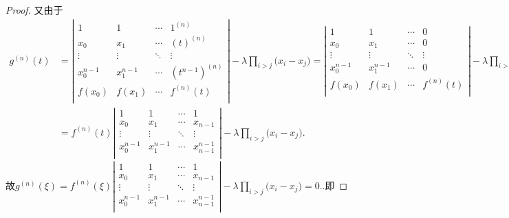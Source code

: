 \documentclass[lang=cn,newtx,10pt,scheme=chinese]{../Template/elegantbook}
\begin{document}
\begin{proof}
    又由于
    \begin{align*}
        g^{\left( n \right)}\left( t \right) &=\left| \begin{matrix}
            1&		1&		\cdots&		1^{\left( n \right)}\\
            x_0&		x_1&		\cdots&		\left( t \right) ^{\left( n \right)}\\
            \vdots&		\vdots&		\ddots&		\vdots\\
            x_{0}^{n-1}&		x_{1}^{n-1}&		\cdots&		\left( t^{n-1} \right) ^{\left( n \right)}\\
            f(x_0)&		f(x_1)&		\cdots&		f^{\left( n \right)}(t)\\
        \end{matrix} \right|-\lambda \prod_{i>j}{(x_i}-x_j)=\left| \begin{matrix}
            1&		1&		\cdots&		0\\
            x_0&		x_1&		\cdots&		0\\
            \vdots&		\vdots&		\ddots&		\vdots\\
            x_{0}^{n-1}&		x_{1}^{n-1}&		\cdots&		0\\
            f(x_0)&		f(x_1)&		\cdots&		f^{\left( n \right)}(t)\\
        \end{matrix} \right|-\lambda \prod_{i>j}{(x_i}-x_j)
        \\
        &=f^{\left( n \right)}(t)\left| \begin{matrix}
            1&		1&		\cdots&		1\\
            x_0&		x_1&		\cdots&		x_{n-1}\\
            \vdots&		\vdots&		\ddots&		\vdots\\
            x_{0}^{n-1}&		x_{1}^{n-1}&		\cdots&		x_{n-1}^{n-1}\\
        \end{matrix} \right|-\lambda \prod_{i>j}{(x_i}-x_j).
        \nonumber
    \end{align*}
    故$g^{\left( n \right)}\left( \xi \right) =f^{\left( n \right)}(\xi )\left| \begin{matrix}
        1&		1&		\cdots&		1\\
        x_0&		x_1&		\cdots&		x_{n-1}\\
        \vdots&		\vdots&		\ddots&		\vdots\\
        x_{0}^{n-1}&		x_{1}^{n-1}&		\cdots&		x_{n-1}^{n-1}\\
    \end{matrix} \right|-\lambda \prod_{i>j}{(x_i}-x_j)=0.$.即

\end{proof}
\end{document}
